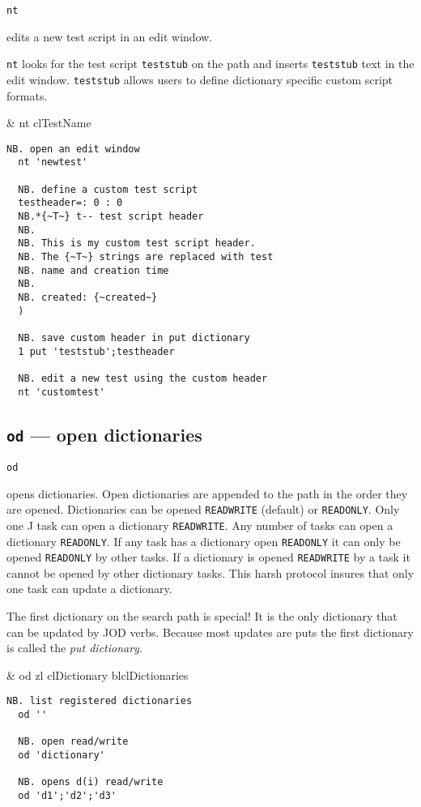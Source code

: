 \hypertarget{il:nt}{\texttt{nt}} edits a new test script in an edit window. 

\texttt{nt} looks for the test script \texttt{teststub} on the path and inserts 
\texttt{teststub} text in the edit window. \texttt{teststub} allows users to define dictionary specific
custom script formats.

\begin{wordhead}
\monad & nt clTestName \\
\end{wordhead}
\begin{lstlisting}[frame=single,framerule=0pt] 
  NB. open an edit window
  nt 'newtest'  

  NB. define a custom test script
  testheader=: 0 : 0
  NB.*{~T~} t-- test script header
  NB. 
  NB. This is my custom test script header.
  NB. The {~T~} strings are replaced with test
  NB. name and creation time
  NB.
  NB. created: {~created~}
  ) 

  NB. save custom header in put dictionary
  1 put 'teststub';testheader

  NB. edit a new test using the custom header
  nt 'customtest'
\end{lstlisting}


\subsection{\texttt{od} --- open dictionaries}\label{ss:od}

 \hypertarget{il:od}{\texttt{od}} opens
 dictionaries. Open dictionaries are appended to the
 path in the order they are opened. Dictionaries can be opened \texttt{READWRITE}
 (default) or \texttt{READONLY}. Only one J task can open 
 a dictionary \texttt{READWRITE}.  
 Any number of tasks can open a dictionary \texttt{READONLY}. 
 If any task has a dictionary open \texttt{READONLY} it can only 
 be opened \texttt{READONLY} by other tasks. If a 
 dictionary is opened \texttt{READWRITE} by a task it 
 cannot be opened by other dictionary tasks. This harsh protocol
  insures that only one task can update a dictionary. 

The first dictionary on the search path is special!  
It is the only dictionary that can be updated by JOD verbs. 
Because most updates are puts the first dictionary is called the \emph{put dictionary}.

\begin{wordhead}
\monad & od zl \argsep clDictionary \argsep blclDictionaries \\
\end{wordhead}
\begin{lstlisting}[frame=single,framerule=0pt] 
  NB. list registered dictionaries 
  od '' 

  NB. open read/write
  od 'dictionary'   
  
  NB. opens d(i) read/write 
  od 'd1';'d2';'d3'  
\end{lstlisting}

